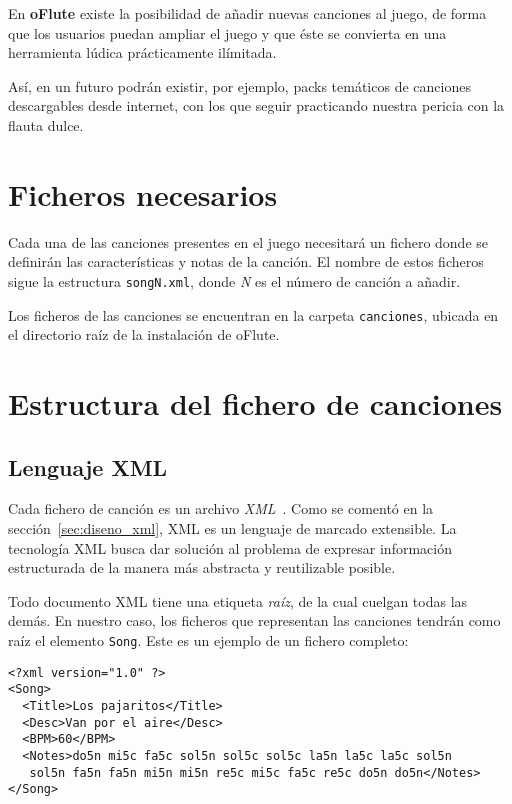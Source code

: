 En \textbf{oFlute} existe la posibilidad de añadir nuevas canciones al juego, de
forma que los usuarios puedan ampliar el juego y que éste se convierta en una
herramienta lúdica prácticamente ilímitada.

Así, en un futuro podrán existir, por ejemplo, packs temáticos de canciones
descargables desde internet, con los que seguir practicando nuestra pericia con
la flauta dulce.

\section{Ficheros necesarios}

Cada una de las canciones presentes en el juego necesitará un fichero donde se
definirán las características y notas de la canción. El nombre de estos ficheros
sigue la estructura \texttt{songN.xml}, donde \textit{N} es el número de canción
a añadir.

Los ficheros de las canciones se encuentran en la carpeta \texttt{canciones},
ubicada en el directorio raíz de la instalación de oFlute. 

\section{Estructura del fichero de canciones}

\subsection{Lenguaje XML}
\label{sec:lenguaje-xml}

Cada fichero de canción es un archivo \textit{XML}~\cite{XMLSpec}. Como se
comentó en la sección~\ref{sec:diseno_xml}, XML es un lenguaje de marcado
extensible. La tecnología XML busca dar solución al problema de expresar
información estructurada de la manera más abstracta y reutilizable posible.

Todo documento XML tiene una etiqueta \textit{raíz}, de la cual cuelgan todas
las demás. En nuestro caso, los ficheros que representan las canciones tendrán
como raíz el elemento \texttt{Song}. Este es un ejemplo de un fichero completo:

\begin{verbatim}
<?xml version="1.0" ?>
<Song>
  <Title>Los pajaritos</Title>
  <Desc>Van por el aire</Desc>
  <BPM>60</BPM>
  <Notes>do5n mi5c fa5c sol5n sol5c sol5c la5n la5c la5c sol5n 
   sol5n fa5n fa5n mi5n mi5n re5c mi5c fa5c re5c do5n do5n</Notes>
</Song>
\end{verbatim}

